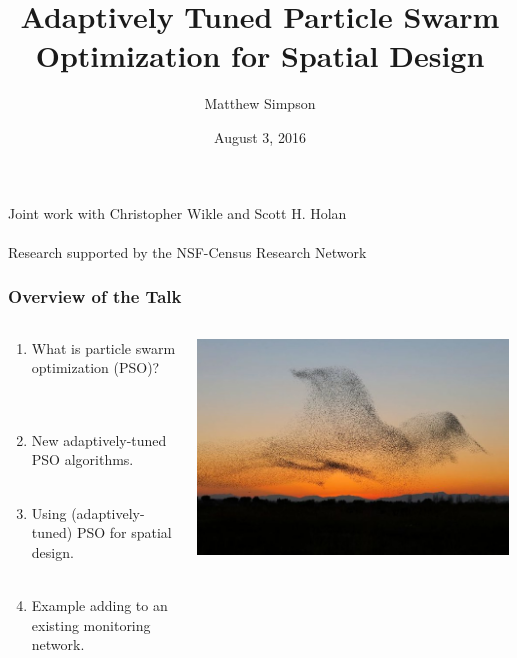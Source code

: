 \documentclass[xcolor=dvipsnames]{beamer}
\title[AT-PSO for Spatial Design]{Adaptively Tuned Particle Swarm Optimization for Spatial Design}
\author[Matt Simpson]{Matthew Simpson}
\institute[Mizzou Stat / SAS]{Department of Statistics, University of Missouri\\
                              SAS Institute, Inc.}
\date{August 3, 2016}
\begin{document}
\begin{frame}
\titlepage
\centering
{\scriptsize
Joint work with Christopher Wikle and Scott H. Holan\\~\\
Research supported by the NSF-Census Research Network}
\end{frame}

\begin{frame}
\frametitle{Overview of the Talk}
\begin{columns}
\begin{column}{0.5\textwidth}
\begin{enumerate}
\item What is particle swarm optimization (PSO)?\\
 \citep{blum2008swarm, clerc2010particle, clerc2011spso}\\~\\
\item New adaptively-tuned PSO algorithms.\\~\\
\item Using (adaptively-tuned) PSO for spatial design.\\~\\
\item Example adding to an existing monitoring network.
\end{enumerate}
\end{column}
\begin{column}{0.5\textwidth}
\includegraphics[width = 0.99\textwidth]{birds3.jpg}
\end{column}
\end{columns}
\end{frame}
\end{document}

